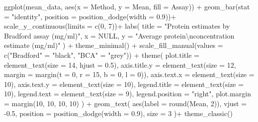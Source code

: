 \documentclass[
  letterpaper,
  DIV=11,
  numbers=noendperiod]{scrreprt}
\newenvironment{Shaded}{\begin{snugshade}}{\end{snugshade}}
\newcommand{\AttributeTok}[1]{\textcolor[rgb]{0.40,0.45,0.13}{#1}}
\newcommand{\ConstantTok}[1]{\textcolor[rgb]{0.56,0.35,0.01}{#1}}
\newcommand{\DecValTok}[1]{\textcolor[rgb]{0.68,0.00,0.00}{#1}}
\newcommand{\FloatTok}[1]{\textcolor[rgb]{0.68,0.00,0.00}{#1}}
\newcommand{\FunctionTok}[1]{\textcolor[rgb]{0.28,0.35,0.67}{#1}}
\newcommand{\NormalTok}[1]{\textcolor[rgb]{0.00,0.23,0.31}{#1}}
\newcommand{\OtherTok}[1]{\textcolor[rgb]{0.00,0.23,0.31}{#1}}
\newcommand{\SpecialCharTok}[1]{\textcolor[rgb]{0.37,0.37,0.37}{#1}}
\newcommand{\StringTok}[1]{\textcolor[rgb]{0.13,0.47,0.30}{#1}}
\begin{document}
\begin{Shaded}
\begin{Highlighting}[]
\FunctionTok{ggplot}\NormalTok{(mean\_data, }\FunctionTok{aes}\NormalTok{(}\AttributeTok{x =}\NormalTok{ Method, }\AttributeTok{y =}\NormalTok{ Mean, }\AttributeTok{fill =}\NormalTok{ Assay)) }\SpecialCharTok{+}
  \FunctionTok{geom\_bar}\NormalTok{(}\AttributeTok{stat =} \StringTok{"identity"}\NormalTok{, }\AttributeTok{position =} \FunctionTok{position\_dodge}\NormalTok{(}\AttributeTok{width =} \FloatTok{0.9}\NormalTok{))}\SpecialCharTok{+} 
  \FunctionTok{scale\_y\_continuous}\NormalTok{(}\AttributeTok{limits =} \FunctionTok{c}\NormalTok{(}\DecValTok{0}\NormalTok{, }\DecValTok{7}\NormalTok{))}\SpecialCharTok{+}
  \FunctionTok{labs}\NormalTok{(}
    \AttributeTok{title =} \StringTok{"Protein estimates by Bradford assay (mg/ml)"}\NormalTok{, }
    \AttributeTok{x =} \ConstantTok{NULL}\NormalTok{, }
    \AttributeTok{y =} \StringTok{"Average protein}\SpecialCharTok{\textbackslash{}n}\StringTok{concentration estimate (mg/ml)"}
\NormalTok{  ) }\SpecialCharTok{+}
  \FunctionTok{theme\_minimal}\NormalTok{() }\SpecialCharTok{+}
  \FunctionTok{scale\_fill\_manual}\NormalTok{(}\AttributeTok{values =} \FunctionTok{c}\NormalTok{(}\StringTok{"Bradford"} \OtherTok{=} \StringTok{"black"}\NormalTok{, }\StringTok{"BCA"} \OtherTok{=} \StringTok{"grey"}\NormalTok{)) }\SpecialCharTok{+}
  \FunctionTok{theme}\NormalTok{(}
    \AttributeTok{plot.title =} \FunctionTok{element\_text}\NormalTok{(}\AttributeTok{size =} \DecValTok{14}\NormalTok{, }\AttributeTok{hjust =} \FloatTok{0.5}\NormalTok{),}
    \AttributeTok{axis.title.y =} \FunctionTok{element\_text}\NormalTok{(}\AttributeTok{size =} \DecValTok{12}\NormalTok{, }\AttributeTok{margin =} \FunctionTok{margin}\NormalTok{(}\AttributeTok{t =} \DecValTok{0}\NormalTok{, }\AttributeTok{r =} \DecValTok{15}\NormalTok{, }\AttributeTok{b =} \DecValTok{0}\NormalTok{, }\AttributeTok{l =} \DecValTok{0}\NormalTok{)),}
    \AttributeTok{axis.text.x =} \FunctionTok{element\_text}\NormalTok{(}\AttributeTok{size =} \DecValTok{10}\NormalTok{),}
    \AttributeTok{axis.text.y =} \FunctionTok{element\_text}\NormalTok{(}\AttributeTok{size =} \DecValTok{10}\NormalTok{),}
    \AttributeTok{legend.title =} \FunctionTok{element\_text}\NormalTok{(}\AttributeTok{size =} \DecValTok{10}\NormalTok{),}
    \AttributeTok{legend.text =} \FunctionTok{element\_text}\NormalTok{(}\AttributeTok{size =} \DecValTok{9}\NormalTok{),}
    \AttributeTok{legend.position =} \StringTok{"right"}\NormalTok{,}
    \AttributeTok{plot.margin =} \FunctionTok{margin}\NormalTok{(}\DecValTok{10}\NormalTok{, }\DecValTok{10}\NormalTok{, }\DecValTok{10}\NormalTok{, }\DecValTok{10}\NormalTok{)}
\NormalTok{  ) }\SpecialCharTok{+}
  \FunctionTok{geom\_text}\NormalTok{(}
    \FunctionTok{aes}\NormalTok{(}\AttributeTok{label =} \FunctionTok{round}\NormalTok{(Mean, }\DecValTok{2}\NormalTok{)),}
    \AttributeTok{vjust =} \SpecialCharTok{{-}}\FloatTok{0.5}\NormalTok{,}
    \AttributeTok{position =} \FunctionTok{position\_dodge}\NormalTok{(}\AttributeTok{width =} \FloatTok{0.9}\NormalTok{),}
    \AttributeTok{size =} \DecValTok{3}
\NormalTok{  )}\SpecialCharTok{+} \FunctionTok{theme\_classic}\NormalTok{()}
\end{Highlighting}
\end{Shaded}
\end{document}

